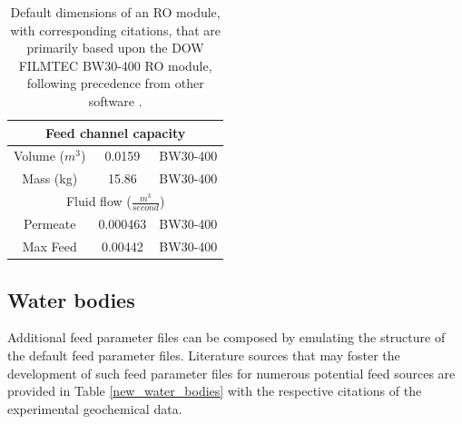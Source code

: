 \begin{supplementary}
\begin{savenotes}
\begin{table}[!h]
\begin{tabular}{|c|c|c|}
        \multicolumn{3}{c}{Feed channel capacity} \\ \midrule
        Volume ($m^3$) & 0.0159 & BW30-400 \cite{2020FilmTecElement}\\
        Mass (kg) & 15.86 & BW30-400 \cite{2020FilmTecElement}\\ \midrule

        \multicolumn{3}{c}{Fluid flow ($\frac{m^3}{second}$)} \\ \midrule
        Permeate & 0.000463 & BW30-400 \cite{2020FilmTecElement}\\
        Max Feed & 0.00442 & BW30-400 \cite{2020FilmTecElement}\\ \bottomrule
        
    \end{tabular}
    \caption{
        Default dimensions of an RO module, with corresponding citations, that are primarily based upon the DOW FILMTEC BW30-400 RO module, following precedence from other software \cite{Li2012OptimalDesalination}.
    }
    \label{RO_dimensions}
\end{table}
\end{savenotes}

\subsection{Water bodies}

Additional feed parameter files can be composed by emulating the structure of the default feed parameter files. Literature sources that may foster the development of such feed parameter files for numerous potential feed sources are provided in Table \ref{new_water_bodies} with the respective citations of the experimental geochemical data. 


\end{supplementary}
